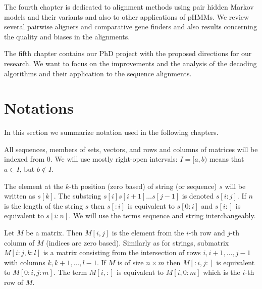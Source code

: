 The fourth chapter is dedicated to alignment methods  using pair hidden Markov
models and their variants and also to other applications of pHMMs. We review
several pairwise aligners and comparative gene finders and also results
concerning the quality and biases in the alignments.

The fifth chapter contains our PhD project with the proposed directions for our
research. We want to focus on the improvements and the analysis of the decoding
algorithms and their application to the sequence alignments. 

\section{Notations}

In this section we summarize notation used in the following
chapters.

All sequences, members of sets, vectors, and rows and columns of matrices will
be indexed from $0$. We will use mostly right-open intervals: $I=[a,b)$ means
that $a\in I$, but $b\notin I$. 

The element at the $k$-th position (zero based) of string (or sequence) $s$ will
be written as $s[k]$. The substring $s[i]s[i+1]\dots s[j-1]$ is denoted
$s[i:j]$.  If $n$ is the length of the string $s$ then $s[:i]$ is equivalent to
$s[0:i]$ and $s[i:]$ is equivalent to $s[i:n]$.  We will use the terms sequence
and string interchangeably.

Let $M$ be a matrix. Then $M[i,j]$ is the element from the $i$-th row and $j$-th
column of $M$ (indices are zero based). Similarly as for strings, submatrix
$M[i:j,k:l]$ is a matrix consisting from the intersection of rows $i,i+1,\dots,
j-1$ with columns $k,k+1,\dots,l-1$. If $M$ is of size $n\times m$ then
$M[:i,j:]$ is equivalent to $M[0:i,j:m]$.  The term $M[i,:]$ is equivalent to
$M[i,0:m]$ which is the $i$-th row of $M$.
